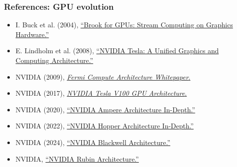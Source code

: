 \documentclass[main.tex]{subfiles}
\begin{document}
\begin{frame}
  \frametitle{References: GPU evolution}
  \small
  \begin{itemize}
    \item I. Buck et al. (2004), \href{https://graphics.stanford.edu/papers/brookgpu/brookgpu.pdf}{``Brook for GPUs: Stream Computing on Graphics Hardware.''}
    \item E. Lindholm et al. (2008), \href{https://www.cs.cmu.edu/afs/cs/academic/class/15869-f11/www/readings/lindholm08_tesla.pdf}{``NVIDIA Tesla: A Unified Graphics and Computing Architecture.''}
    \item NVIDIA (2009), \href{https://www.nvidia.com/content/PDF/fermi_white_papers/NVIDIA_Fermi_Compute_Architecture_Whitepaper.pdf}{\emph{Fermi Compute Architecture Whitepaper}.}
    \item NVIDIA (2017), \href{https://images.nvidia.com/content/volta-architecture/pdf/volta-architecture-whitepaper.pdf}{\emph{NVIDIA Tesla V100 GPU Architecture}.}
    \item NVIDIA (2020), \href{https://developer.nvidia.com/blog/nvidia-ampere-architecture-in-depth/}{``NVIDIA Ampere Architecture In-Depth.''}
    \item NVIDIA (2022), \href{https://developer.nvidia.com/blog/nvidia-hopper-architecture-in-depth/}{``NVIDIA Hopper Architecture In-Depth.''}
    \item NVIDIA (2024), \href{https://www.nvidia.com/en-us/data-center/technologies/blackwell-architecture/}{``NVIDIA Blackwell Architecture.''}
    \item NVIDIA, \href{https://www.nvidia.com/en-us/data-center/technologies/rubin/}{``NVIDIA Rubin Architecture.''}
  \end{itemize}
\end{frame}
\end{document}
